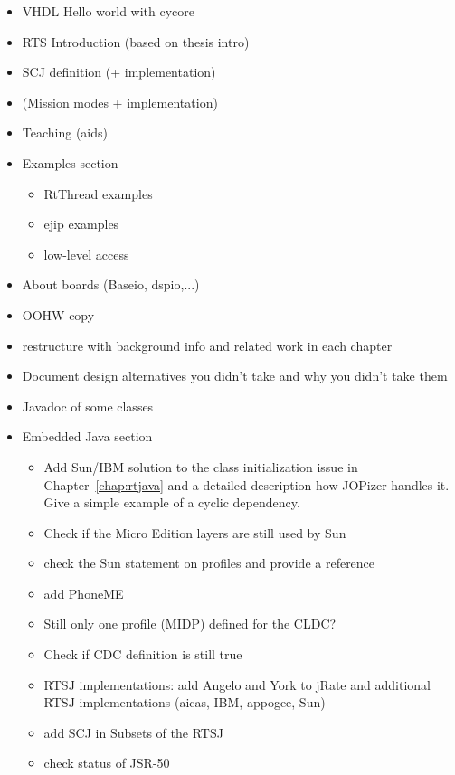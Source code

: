 \begin{itemize}
    \item VHDL Hello world with cycore
    \item RTS Introduction (based on thesis intro)
    \item SCJ definition (+ implementation)
    \item (Mission modes + implementation)
    \item Teaching (aids)
    \item Examples section
    \begin{itemize}
        \item RtThread examples
        \item ejip examples
        \item low-level access
    \end{itemize}
    \item About boards (Baseio, dspio,...)
    \item OOHW copy
    \item restructure with background info and related work in
        each chapter
    \item Document design alternatives you didn't take and why
        you didn't take them
    \item Javadoc of some classes
    \item Embedded Java section
    \begin{itemize}
        \item Add Sun/IBM solution to the class initialization issue in
        Chapter~\ref{chap:rtjava} and a detailed description how JOPizer
        handles it. Give a simple example of a cyclic dependency.
        \item Check if the Micro Edition layers are still used by
        Sun
        \item check the Sun statement on profiles and provide a
        reference
        \item add PhoneME
        \item Still only one profile (MIDP) defined for the CLDC?
        \item Check if CDC definition is still true
        \item RTSJ implementations: add Angelo and York to jRate and
        additional RTSJ implementations (aicas, IBM, appogee, Sun)
        \item add SCJ in Subsets of the RTSJ
        \item check status of JSR-50
    \end{itemize}

\end{itemize}
